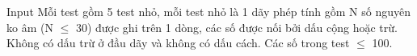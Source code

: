 Input  
Mỗi test gồm 5 test nhỏ, mỗi test nhỏ là 1 dãy phép tính gồm N số nguyên ko âm (N  $\le$  30) được ghi trên 1 dòng, các số được nối bởi dấu cộng hoặc trừ. Không có dấu trừ ở đầu dãy và không có dấu cách. Các số trong test  $\le$  100.